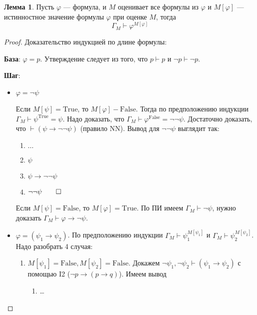 \documentclass[12pt]{article}
\let\im\rightarrow
\let\n\neg
\theoremstyle{definition}
\theoremstyle{statement}
\theoremstyle{theorem}
\newtheorem{lemma}{Лемма}[section]
\begin{document}
\begin{lemma}
  Пусть $\varphi$ --- формула, и $M$ оценивает все формулы из
  $\varphi$ и $M[\varphi]$ --- истинностное значение формулы
  $\varphi$ при оценке $M$, тогда
  \[
    \Gamma_M \vdash \varphi^{M[\varphi]}
  \]
  \begin{proof}
    Доказательство индукцией по длине формулы:

    \textbf{База}: $\varphi = p$. Утверждение следует из того, что $p
    \vdash p$ и $\n p \vdash \n p$.

    \textbf{Шаг}:
    \begin{itemize}
      \item $\varphi = \n \psi$

        Если $M[\psi] = \mathrm{True}$, то $M[\varphi] -
        \mathrm{False}$. Тогда по предположению индукции $\Gamma_M
        \vdash \psi^{\mathrm{True}} = \psi$. Надо доказать, что
        $\Gamma_M \vdash \varphi^{\mathrm{False}} = \n \n \psi$.
        Достаточно доказать, что $\vdash (\psi \im \n \n \psi)$
        (правило NN). Вывод для $\n \n \psi$ выглядит так:
        \begin{enumerate}
          \item $\dots$

          \item $\psi$

          \item $\psi \im \n \n \psi$

          \item $\n \n \psi \qed$
        \end{enumerate}

        Если $M[\psi] = \mathrm{False}$, то $M[\varphi] =
        \mathrm{True}$. По ПИ имеем $\Gamma_M \vdash \n \psi$, нужно
        доказать $\Gamma_M \vdash \varphi \im \n \psi$.

      \item $\varphi = (\psi_1 \im \psi_2)$. По предположению
        индукции $\Gamma_M \vdash \psi_1^{M[\psi_1]}$ и $\Gamma_M
        \vdash \psi_2^{M[\psi_2]}$. Надо разобрать 4 случая:
        \begin{enumerate}
          \item $M[\psi_1] = \mathrm{False}, M[\psi_2] =
            \mathrm{False}$. Докажем $\n \psi_1, \n \psi_2 \vdash
            (\psi_1 \im \psi_2)$ с помощью I2 ($\n p \im (p \im q)$).
            Имеем вывод
            \begin{enumerate}
              \item \dots


\end{enumerate}
\end{enumerate}
\end{itemize}
\end{proof}
\end{lemma}
\end{document}
